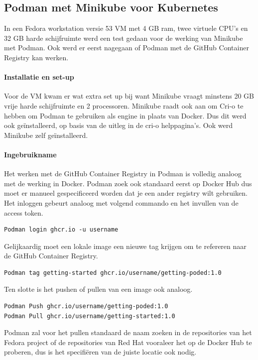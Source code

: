 \subsection{Podman met Minikube voor Kubernetes}
In een Fedora workstation versie 53 VM met 4 GB ram, twee virtuele CPU’s en 32 GB harde schijfruimte werd een test gedaan voor de werking van Minikube met Podman. Ook werd er eerst nagegaan of Podman met de GitHub Container Registry kan werken.
\paragraph{Installatie en set-up}
Voor de VM kwam er wat extra set up bij want Minikube vraagt minstens 20 GB vrije harde schijfruimte en 2 processoren.
Minikube raadt ook aan om Cri-o te hebben om Podman te gebruiken als engine in plaats van Docker. Dus dit werd ook geïnstalleerd, op basis van de uitleg in de cri-o helppagina’s. Ook werd Minikube zelf geïnstalleerd.

\paragraph{Ingebruikname}
Het werken met de GitHub Container Registry in Podman is volledig analoog met de werking in Docker. Podman zoek ook standaard eerst op Docker Hub dus moet er manueel gespecificeerd worden dat je een ander registry wilt gebruiken. Het inloggen gebeurt analoog met volgend commando en het invullen van de access token.
\begin{verbatim}
Podman login ghcr.io -u username
\end{verbatim}

Gelijkaardig moet een lokale image een nieuwe tag krijgen om te refereren naar de GitHub Container Registry.
\begin{verbatim}
Podman tag getting-started ghcr.io/username/getting-poded:1.0
\end{verbatim}

Ten slotte is het pushen of pullen van een image ook analoog.
\begin{verbatim}
Podman Push ghcr.io/username/getting-poded:1.0
Podman Pull ghcr.io/username/getting-started:1.0
\end{verbatim}

Podman zal voor het pullen standaard de naam zoeken in de repositories van het Fedora project of de repositories van Red Hat vooraleer het op de Docker Hub te proberen, dus is het specifiëren van de juiste locatie ook nodig.

